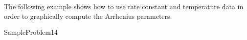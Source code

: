 \documentclass[main.tex]{subfiles}
\newcommand\chapterlabel{kinetics}
\begin{document}
\begin{description}



The following example shows how to use rate constant and temperature data in order to graphically compute the Arrhenius parameters.


  {SampleProblem14}

\end{description}
\end{document}
